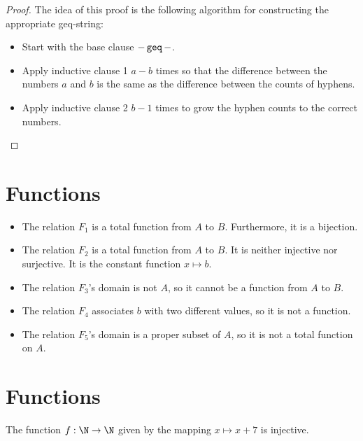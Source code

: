 \documentclass[11pt,letterpaper]{article}
\begin{document}
\begin{enumerate}
\begin{proof}
            The idea of this proof is the following algorithm for constructing
            the appropriate geq-string:
            \begin{itemize}
                \item
                    Start with the base clause $- \operatorname{\mathtt{geq}} -$.
                \item
                    Apply inductive clause 1 $a-b$ times so that the difference
                    between the numbers $a$ and $b$ is the same as the
                    difference between the counts of hyphens.
                \item
                    Apply inductive clause 2 $b-1$ times to grow the hyphen
                    counts to the correct numbers.
            \end{itemize}
        \end{proof}
\end{enumerate}

\section{Functions}

\begin{itemize}
    \item
        The relation $F_1$ is a total function from $A$ to $B$.
        Furthermore, it is a bijection.
    \item
        The relation $F_2$ is a total function from $A$ to $B$.
        It is neither injective nor surjective. It is the constant function
        $x \mapsto b$.
    \item
        The relation $F_3$'s domain is not $A$, so it cannot be a function from
        $A$ to $B$.
    \item
        The relation $F_4$ associates $b$ with two different values, so it is
        not a function.
    \item
        The relation $F_5$'s domain is a proper subset of $A$, so it is not a
        total function on $A$.
\end{itemize}

\section{Functions}

\begin{prop}
    The function $f : \N \to \N$ given by the mapping $x \mapsto x + 7$ is
    injective.
\end{prop}
\end{document}
